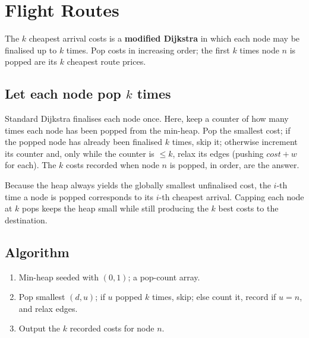 \section{Flight Routes}
\label{sec:cses-flight-routes}


\begin{patternbox}
The $k$ cheapest arrival costs is a \textbf{modified Dijkstra} in which each
node may be finalised up to $k$ times. Pop costs in increasing order; the
first $k$ times node $n$ is popped are its $k$ cheapest route prices.
\end{patternbox}

\subsection*{Let each node pop $k$ times}

Standard Dijkstra finalises each node once. Here, keep a counter of how many
times each node has been popped from the min-heap. Pop the smallest cost;
if the popped node has already been finalised $k$ times, skip it; otherwise
increment its counter and, only while the counter is $\le k$, relax its
edges (pushing $\textit{cost}+w$ for each). The $k$ costs recorded when node
$n$ is popped, in order, are the answer.

\begin{ideabox}
Because the heap always yields the globally smallest unfinalised cost, the
$i$-th time a node is popped corresponds to its $i$-th cheapest arrival.
Capping each node at $k$ pops keeps the heap small while still producing the
$k$ best costs to the destination.
\end{ideabox}

\subsection*{Algorithm}

\begin{enumerate}
  \item Min-heap seeded with $(0,1)$; a pop-count array.
  \item Pop smallest $(d,u)$; if $u$ popped $k$ times, skip; else count it,
        record if $u=n$, and relax edges.
  \item Output the $k$ recorded costs for node $n$.
\end{enumerate}

